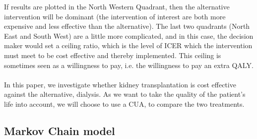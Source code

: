 \documentclass[a4paper,12pt]{article}
\begin{document}
If results are plotted in the North Western Quadrant, then the alternative intervention will be dominant (the intervention of interest are both more expensive and less effective than the alternative). The last two quadrants (North East and South West) are a little more complicated, and in this case, the decision maker would set a ceiling ratio, which is the level of ICER which the intervention must meet to be cost effective and thereby implemented.   This ceiling is sometimes seen as a willingness to pay, i.e. the willingness to pay an extra QALY. 
\\\\
In this paper, we investigate whether kidney transplantation is cost effective against the alternative, dialysis. As we want to take the quality of the patient’s life into account, we will choose to use a CUA, to compare the two treatments.  

\subsection{Markov Chain model}
\end{document}

